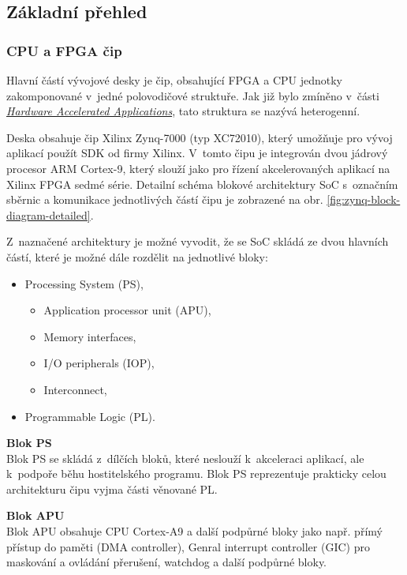 \documentclass[a4paper, twoside, 11pt]{article}
\begin{document}
		\subsection{Základní přehled}
		\subsubsection{CPU a FPGA čip}
			Hlavní částí vývojové desky je čip, obsahující FPGA a CPU jednotky zakomponované v~jedné polovodičové struktuře. Jak již bylo zmíněno v~části \hyperref[subsec:hardware-accelerated-applications]{\textit{Hardware Accelerated Applications}}, tato struktura se nazývá heterogenní.\par
			Deska obsahuje čip Xilinx Zynq-7000 (typ XC72010), který umožňuje pro vývoj aplikací použít SDK od firmy Xilinx. V~tomto čipu je integrován dvou jádrový procesor ARM Cortex-9, který slouží jako pro řízení akcelerovaných aplikací na Xilinx FPGA sedmé série. Detailní schéma blokové architektury SoC s~označním sběrnic a komunikace jednotlivých částí čipu je zobrazené na obr. \ref{fig:zynq-block-diagram-detailed}.\par
			Z~naznačené architektury je možné vyvodit, že se SoC skládá ze dvou hlavních částí, které je možné dále rozdělit na jednotlivé bloky:
			\begin{itemize}
				\item Processing System (PS),
				\begin{itemize}
					\item Application processor unit (APU),
					\item Memory interfaces,
					\item I/O peripherals (IOP),
					\item Interconnect,
				\end{itemize}
				\item Programmable Logic (PL).
			\end{itemize}
			\vspace*{0.25cm}
			\noindent\textbf{Blok PS}\\
			Blok PS se skládá z~dílčích bloků, které neslouží k~akceleraci aplikací, ale k~podpoře běhu hostitelského programu. Blok PS reprezentuje prakticky celou architekturu čipu vyjma části věnované PL.\par\vspace*{0.25cm}
			\noindent\textbf{Blok APU}\\
			Blok APU obsahuje CPU Cortex-A9 a další podpůrné bloky jako např. přímý přístup do paměti (DMA controller), Genral interrupt controller (GIC) pro maskování a ovládání přerušení, watchdog a další podpůrné bloky.\par\vspace*{0.25cm}
\end{document}

